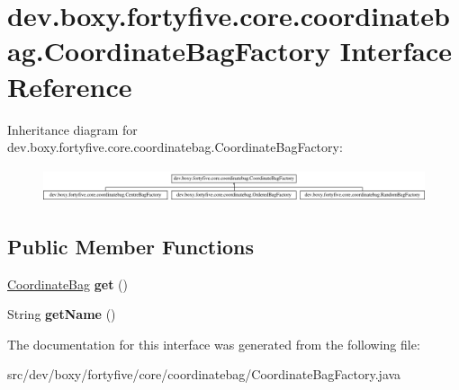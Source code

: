 \hypertarget{interfacedev_1_1boxy_1_1fortyfive_1_1core_1_1coordinatebag_1_1_coordinate_bag_factory}{
\section{dev.boxy.fortyfive.core.coordinatebag.CoordinateBagFactory Interface Reference}
\label{df/d0a/interfacedev_1_1boxy_1_1fortyfive_1_1core_1_1coordinatebag_1_1_coordinate_bag_factory}
}
Inheritance diagram for dev.boxy.fortyfive.core.coordinatebag.CoordinateBagFactory:\begin{figure}[H]
\begin{center}
\leavevmode
\includegraphics[height=1.009009cm]{df/d0a/interfacedev_1_1boxy_1_1fortyfive_1_1core_1_1coordinatebag_1_1_coordinate_bag_factory}
\end{center}
\end{figure}
\subsection*{Public Member Functions}
\begin{DoxyCompactItemize}
\item 
\hypertarget{interfacedev_1_1boxy_1_1fortyfive_1_1core_1_1coordinatebag_1_1_coordinate_bag_factory_a0fdc11a210dc8d6c4e7a840f204591a5}{
\hyperlink{interfacedev_1_1boxy_1_1fortyfive_1_1core_1_1coordinatebag_1_1_coordinate_bag}{CoordinateBag} {\bfseries get} ()}
\label{df/d0a/interfacedev_1_1boxy_1_1fortyfive_1_1core_1_1coordinatebag_1_1_coordinate_bag_factory_a0fdc11a210dc8d6c4e7a840f204591a5}

\item 
\hypertarget{interfacedev_1_1boxy_1_1fortyfive_1_1core_1_1coordinatebag_1_1_coordinate_bag_factory_a50c375ac7a45553413883f84d5853206}{
String {\bfseries getName} ()}
\label{df/d0a/interfacedev_1_1boxy_1_1fortyfive_1_1core_1_1coordinatebag_1_1_coordinate_bag_factory_a50c375ac7a45553413883f84d5853206}

\end{DoxyCompactItemize}


The documentation for this interface was generated from the following file:\begin{DoxyCompactItemize}
\item 
src/dev/boxy/fortyfive/core/coordinatebag/CoordinateBagFactory.java\end{DoxyCompactItemize}
